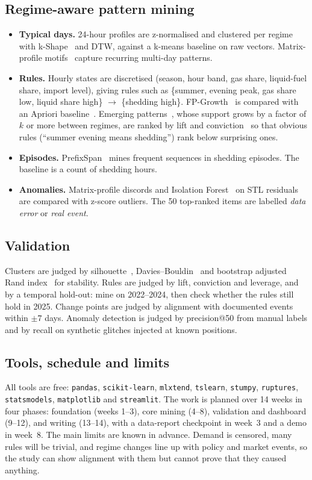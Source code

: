 \documentclass[10pt,a4paper]{article}
\begin{document}
\subsection{Regime-aware pattern mining}
\begin{itemize}
  \item \textbf{Typical days.} 24-hour profiles are z-normalised and clustered per regime with k-Shape~\cite{paparrizos2015} and DTW, against a k-means baseline on raw vectors. Matrix-profile motifs~\cite{yeh2016,law2019} capture recurring multi-day patterns.
  \item \textbf{Rules.} Hourly states are discretised (season, hour band, gas share, liquid-fuel share, import level), giving rules such as \{summer, evening peak, gas share low, liquid share high\} $\to$ \{shedding high\}. FP-Growth~\cite{han2000} is compared with an Apriori baseline~\cite{agrawal1994}. Emerging patterns~\cite{dong1999}, whose support grows by a factor of $k$ or more between regimes, are ranked by lift and conviction~\cite{brin1997} so that obvious rules (``summer evening means shedding'') rank below surprising ones.
  \item \textbf{Episodes.} PrefixSpan~\cite{pei2001} mines frequent sequences in shedding episodes. The baseline is a count of shedding hours.
  \item \textbf{Anomalies.} Matrix-profile discords and Isolation Forest~\cite{liu2008} on STL residuals~\cite{cleveland1990} are compared with z-score outliers. The 50 top-ranked items are labelled \emph{data error} or \emph{real event}.
\end{itemize}

\subsection{Validation}
Clusters are judged by silhouette~\cite{rousseeuw1987}, Davies--Bouldin~\cite{davies1979} and bootstrap adjusted Rand index~\cite{hubert1985} for stability. Rules are judged by lift, conviction and leverage, and by a temporal hold-out: mine on 2022--2024, then check whether the rules still hold in 2025. Change points are judged by alignment with documented events within $\pm 7$ days. Anomaly detection is judged by precision@50 from manual labels and by recall on synthetic glitches injected at known positions.

\subsection{Tools, schedule and limits}
All tools are free: \texttt{pandas}, \texttt{scikit-learn}, \texttt{mlxtend}, \texttt{tslearn}, \texttt{stumpy}, \texttt{ruptures}, \texttt{statsmodels}, \texttt{matplotlib} and \texttt{streamlit}. The work is planned over 14 weeks in four phases: foundation (weeks 1--3), core mining (4--8), validation and dashboard (9--12), and writing (13--14), with a data-report checkpoint in week~3 and a demo in week~8. The main limits are known in advance. Demand is censored, many rules will be trivial, and regime changes line up with policy and market events, so the study can show alignment with them but cannot prove that they caused anything.
\end{document}
